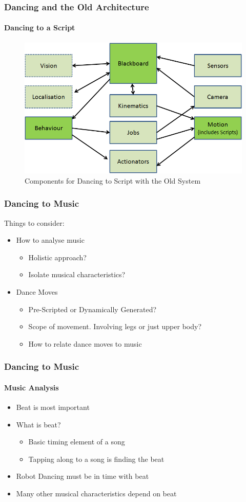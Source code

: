 \documentclass{beamer}
\begin{document}
	\begin{frame}
		\frametitle{Dancing and the Old Architecture}
		\framesubtitle{Dancing to a Script}
		\begin{figure}
			\centering
			\includegraphics[scale=.45]{Presentation_Images/dance_script_old_arc.png}
			\caption{Components for Dancing to Script with the Old System}
		\end{figure}
	\end{frame}	
	\begin{frame}
		\frametitle{Dancing to Music}
		Things to consider:
		\begin{itemize}
			\item How to analyse music
			\begin{itemize}
				\item Holistic approach?
				\item Isolate musical characteristics?
			\end{itemize}
			\item Dance Moves
			\begin{itemize}
				\item Pre-Scripted or Dynamically Generated?
				\item Scope of movement. Involving legs or just upper body?
				\item How to relate dance moves to music
			\end{itemize}
		\end{itemize}
	\end{frame}	
	\begin{frame}
		\frametitle{Dancing to Music}
		\framesubtitle{Music Analysis}
		\begin{itemize}
			\item Beat is most important
			\item What is beat?
			\begin{itemize}
				\item Basic timing element of a song
				\item Tapping along to a song is finding the beat
			\end{itemize}
			\item Robot Dancing must be in time with beat
			\item Many other musical characteristics depend on beat
		\end{itemize}
	\end{frame}	
\end{document}
